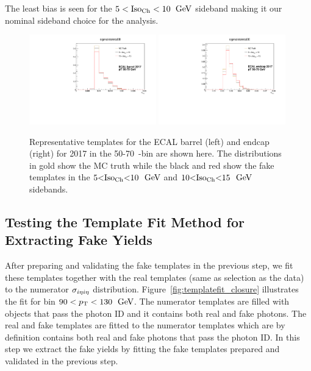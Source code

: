 
The least bias is seen for the $5 < \text{Iso}_{\text{Ch}} < 10$ $\,\text{Ge\hspace{-.08em}V}$ sideband making it our nominal sideband choice for the analysis.


\begin{figure}[!htbp]
 \caption{Representative \sieie templates for the ECAL barrel (left) and endcap (right) for 2017 in the 50-70~\GeV \pt-bin are shown here. The distributions in gold show the MC truth while the black and red show the fake templates in the $5 \mathopen< \text{Iso}_{\text{Ch}} \mathclose< 10$ $\,\text{Ge\hspace{-.08em}V}$ and $10 \mathopen< \text{Iso}_{\text{Ch}} \mathclose< 15$ $\,\text{Ge\hspace{-.08em}V}$ sidebands.}
  \centering
  \includegraphics[width=0.49\textwidth]{fig/MCtemplates_pT50To70EB2017.pdf}
  \includegraphics[width=0.49\textwidth]{fig/MCtemplates_pT50To70EE2017.pdf}
  \label{fig:template_comparisons}
\end{figure}

\subsection{Testing the Template Fit Method for Extracting Fake Yields}

After preparing and validating the fake templates in the previous step, we fit these templates together with the real templates (same as selection as the data) to the numerator $\sigma_{i\eta i\eta}$ distribution. Figure~\ref{fig:templatefit_closure} illustrates the fit for \pt bin $90 < p_{\mathrm{T}} < 130$ $\,\text{Ge\hspace{-.08em}V}$. The numerator templates are filled with objects that pass the photon ID and it contains both real and fake photons. The real and fake templates are fitted to the numerator templates which are by definition contains both real and fake photons that pass the photon ID. In this step we extract the fake yields by fitting the fake templates prepared and validated in the previous step.

